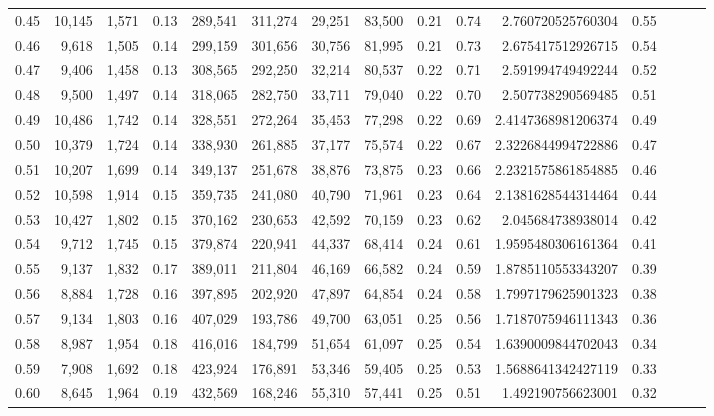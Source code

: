 \begin{tabular}{rrrrrrrrrrrrrrr}
0.45 &  10,145 &  1,571 &  0.13 &  289,541 &  311,274 &   29,251 &   83,500 &  0.21 &  0.74 &     2.760720525760304 &      0.55 \\
0.46 &   9,618 &  1,505 &  0.14 &  299,159 &  301,656 &   30,756 &   81,995 &  0.21 &  0.73 &     2.675417512926715 &      0.54 \\
0.47 &   9,406 &  1,458 &  0.13 &  308,565 &  292,250 &   32,214 &   80,537 &  0.22 &  0.71 &     2.591994749492244 &      0.52 \\
0.48 &   9,500 &  1,497 &  0.14 &  318,065 &  282,750 &   33,711 &   79,040 &  0.22 &  0.70 &     2.507738290569485 &      0.51 \\
0.49 &  10,486 &  1,742 &  0.14 &  328,551 &  272,264 &   35,453 &   77,298 &  0.22 &  0.69 &    2.4147368981206374 &      0.49 \\
0.50 &  10,379 &  1,724 &  0.14 &  338,930 &  261,885 &   37,177 &   75,574 &  0.22 &  0.67 &    2.3226844994722886 &      0.47 \\
0.51 &  10,207 &  1,699 &  0.14 &  349,137 &  251,678 &   38,876 &   73,875 &  0.23 &  0.66 &    2.2321575861854885 &      0.46 \\
0.52 &  10,598 &  1,914 &  0.15 &  359,735 &  241,080 &   40,790 &   71,961 &  0.23 &  0.64 &    2.1381628544314464 &      0.44 \\
0.53 &  10,427 &  1,802 &  0.15 &  370,162 &  230,653 &   42,592 &   70,159 &  0.23 &  0.62 &     2.045684738938014 &      0.42 \\
0.54 &   9,712 &  1,745 &  0.15 &  379,874 &  220,941 &   44,337 &   68,414 &  0.24 &  0.61 &    1.9595480306161364 &      0.41 \\
0.55 &   9,137 &  1,832 &  0.17 &  389,011 &  211,804 &   46,169 &   66,582 &  0.24 &  0.59 &    1.8785110553343207 &      0.39 \\
0.56 &   8,884 &  1,728 &  0.16 &  397,895 &  202,920 &   47,897 &   64,854 &  0.24 &  0.58 &    1.7997179625901323 &      0.38 \\
0.57 &   9,134 &  1,803 &  0.16 &  407,029 &  193,786 &   49,700 &   63,051 &  0.25 &  0.56 &    1.7187075946111343 &      0.36 \\
0.58 &   8,987 &  1,954 &  0.18 &  416,016 &  184,799 &   51,654 &   61,097 &  0.25 &  0.54 &    1.6390009844702043 &      0.34 \\
0.59 &   7,908 &  1,692 &  0.18 &  423,924 &  176,891 &   53,346 &   59,405 &  0.25 &  0.53 &    1.5688641342427119 &      0.33 \\
0.60 &   8,645 &  1,964 &  0.19 &  432,569 &  168,246 &   55,310 &   57,441 &  0.25 &  0.51 &     1.492190756623001 &      0.32 \\

\end{tabular}
